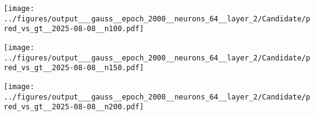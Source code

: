 \begin{otherlanguage}{ngerman}
\begin{samepage}
\begin{minipage}{\textwidth}
\begin{minipage}{0.05\textwidth}
    \centering{}
\end{minipage}%
\begin{minipage}{0.3\textwidth}
    \centering
    \texttt{[image: ../figures/output\_\_\_gauss\_\_epoch\_2000\_\_neurons\_64\_\_layer\_2/Candidate/pred\_vs\_gt\_\_2025-08-08\_\_n100.pdf]}
\end{minipage}%
\begin{minipage}{0.3\textwidth}
    \centering
    \texttt{[image: ../figures/output\_\_\_gauss\_\_epoch\_2000\_\_neurons\_64\_\_layer\_2/Candidate/pred\_vs\_gt\_\_2025-08-08\_\_n150.pdf]}
\end{minipage}%
\begin{minipage}{0.3\textwidth}
    \centering
    \texttt{[image: ../figures/output\_\_\_gauss\_\_epoch\_2000\_\_neurons\_64\_\_layer\_2/Candidate/pred\_vs\_gt\_\_2025-08-08\_\_n200.pdf]}
\end{minipage}

\label{fig:pred_vs_gt_matrix}

\end{minipage}
\end{samepage}


\clearpage







\end{otherlanguage}
